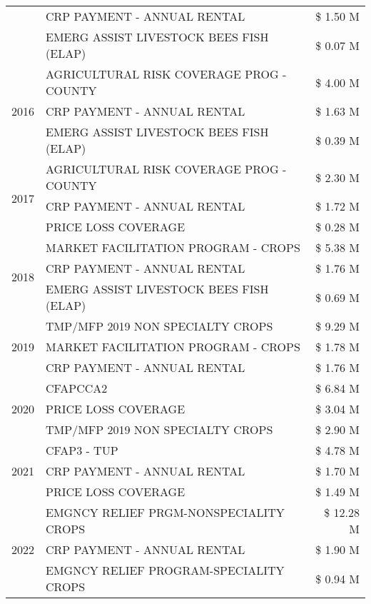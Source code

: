 \begin{tabular}{llr}
 & CRP PAYMENT - ANNUAL RENTAL & \$ 1.50 M \\
 & EMERG ASSIST LIVESTOCK BEES FISH (ELAP) & \$ 0.07 M \\
\cline{1-3}
\multirow[t]{3}{*}{2016} & AGRICULTURAL RISK COVERAGE PROG - COUNTY & \$ 4.00 M \\
 & CRP PAYMENT - ANNUAL RENTAL & \$ 1.63 M \\
 & EMERG ASSIST LIVESTOCK BEES FISH (ELAP) & \$ 0.39 M \\
\cline{1-3}
\multirow[t]{3}{*}{2017} & AGRICULTURAL RISK COVERAGE PROG - COUNTY & \$ 2.30 M \\
 & CRP PAYMENT - ANNUAL RENTAL & \$ 1.72 M \\
 & PRICE LOSS COVERAGE & \$ 0.28 M \\
\cline{1-3}
\multirow[t]{3}{*}{2018} & MARKET FACILITATION PROGRAM - CROPS & \$ 5.38 M \\
 & CRP PAYMENT - ANNUAL RENTAL & \$ 1.76 M \\
 & EMERG ASSIST LIVESTOCK BEES FISH (ELAP) & \$ 0.69 M \\
\cline{1-3}
\multirow[t]{3}{*}{2019} & TMP/MFP 2019 NON SPECIALTY CROPS & \$ 9.29 M \\
 & MARKET FACILITATION PROGRAM - CROPS & \$ 1.78 M \\
 & CRP PAYMENT - ANNUAL RENTAL & \$ 1.76 M \\
\cline{1-3}
\multirow[t]{3}{*}{2020} & CFAPCCA2 & \$ 6.84 M \\
 & PRICE LOSS COVERAGE & \$ 3.04 M \\
 & TMP/MFP 2019 NON SPECIALTY CROPS & \$ 2.90 M \\
\cline{1-3}
\multirow[t]{3}{*}{2021} & CFAP3 - TUP & \$ 4.78 M \\
 & CRP PAYMENT - ANNUAL RENTAL & \$ 1.70 M \\
 & PRICE LOSS COVERAGE & \$ 1.49 M \\
\cline{1-3}
\multirow[t]{3}{*}{2022} & EMGNCY RELIEF PRGM-NONSPECIALITY CROPS & \$ 12.28 M \\
 & CRP PAYMENT - ANNUAL RENTAL & \$ 1.90 M \\
 & EMGNCY RELIEF PROGRAM-SPECIALITY CROPS & \$ 0.94 M \\
\cline{1-3}
\bottomrule
\end{tabular}
